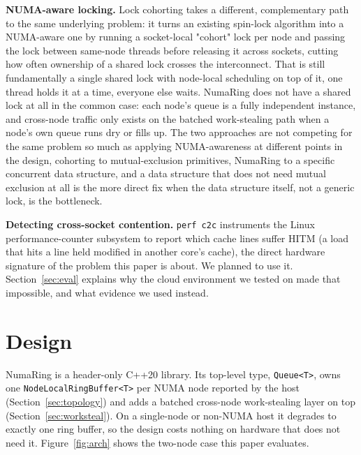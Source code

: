 \documentclass[10pt,journal,compsoc]{IEEEtran}
\begin{document}
\textbf{NUMA-aware locking.} Lock cohorting \cite{dice2012cohorting} takes a different, complementary
path to the same underlying problem: it turns an existing spin-lock algorithm into a NUMA-aware one
by running a socket-local "cohort" lock per node and passing the lock between same-node threads
before releasing it across sockets, cutting how often ownership of a shared lock crosses the
interconnect. That is still fundamentally a single shared lock with node-local scheduling on top of
it, one thread holds it at a time, everyone else waits. NumaRing does not have a shared lock at all
in the common case: each node's queue is a fully independent instance, and cross-node traffic only
exists on the batched work-stealing path when a node's own queue runs dry or fills up. The two
approaches are not competing for the same problem so much as applying NUMA-awareness at different
points in the design, cohorting to mutual-exclusion primitives, NumaRing to a specific concurrent
data structure, and a data structure that does not need mutual exclusion at all is the more direct
fix when the data structure itself, not a generic lock, is the bottleneck.

\textbf{Detecting cross-socket contention.} \texttt{perf c2c} \cite{mario2016c2c} instruments the
Linux performance-counter subsystem to report which cache lines suffer HITM (a load that hits a
line held modified in another core's cache), the direct hardware signature of the problem this
paper is about. We planned to use it. Section~\ref{sec:eval} explains why the cloud environment we
tested on made that impossible, and what evidence we used instead.

\section{Design}
\label{sec:design}

NumaRing is a header-only C++20 library. Its top-level type, \texttt{Queue<T>}, owns one
\texttt{NodeLocalRingBuffer<T>} per NUMA node reported by the host (Section~\ref{sec:topology}) and
adds a batched cross-node work-stealing layer on top (Section~\ref{sec:worksteal}). On a
single-node or non-NUMA host it degrades to exactly one ring buffer, so the design costs nothing on
hardware that does not need it. Figure~\ref{fig:arch} shows the two-node case this paper evaluates.
\end{document}
